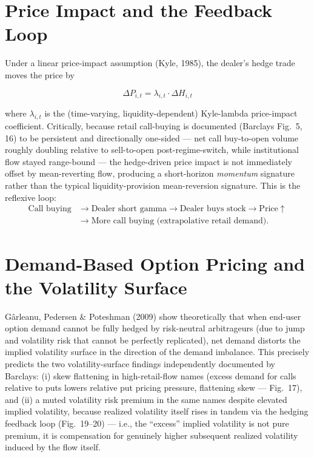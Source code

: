 \documentclass[11pt]{report}
\begin{document}
\section{Price Impact and the Feedback Loop}
Under a linear price-impact assumption (Kyle, 1985), the dealer's hedge trade moves the
price by

\begin{equation}
    \Delta P_{i,t} = \lambda_{i,t} \cdot \Delta H_{i,t}
\end{equation}

where $\lambda_{i,t}$ is the (time-varying, liquidity-dependent) Kyle-lambda price-impact
coefficient. Critically, because retail call-buying is documented (Barclays Fig.\ 5, 16)
to be persistent and directionally one-sided --- net call buy-to-open volume roughly
doubling relative to sell-to-open post-regime-switch, while institutional flow stayed
range-bound --- the hedge-driven price impact is not immediately offset by mean-reverting
flow, producing a short-horizon \emph{momentum} signature rather than the typical
liquidity-provision mean-reversion signature. This is the reflexive loop:
\[
\begin{aligned}
\text{Call buying} &\rightarrow \text{Dealer short gamma} \rightarrow \text{Dealer buys stock} \rightarrow \text{Price} \uparrow \\
&\rightarrow \text{More call buying (extrapolative retail demand)}.
\end{aligned}
\]

\section{Demand-Based Option Pricing and the Volatility Surface}
Gârleanu, Pedersen \& Poteshman (2009) show theoretically that when end-user option
demand cannot be fully hedged by risk-neutral arbitrageurs (due to jump and volatility
risk that cannot be perfectly replicated), net demand distorts the implied volatility
surface in the direction of the demand imbalance. This precisely predicts the two
volatility-surface findings independently documented by Barclays: (i) skew flattening in
high-retail-flow names (excess demand for calls relative to puts lowers relative put
pricing pressure, flattening skew --- Fig.\ 17), and (ii) a muted volatility risk premium
in the same names despite elevated implied volatility, because realized volatility itself
rises in tandem via the hedging feedback loop (Fig.\ 19--20) --- i.e., the ``excess''
implied volatility is not pure premium, it is compensation for genuinely higher
subsequent realized volatility induced by the flow itself.
\end{document}
